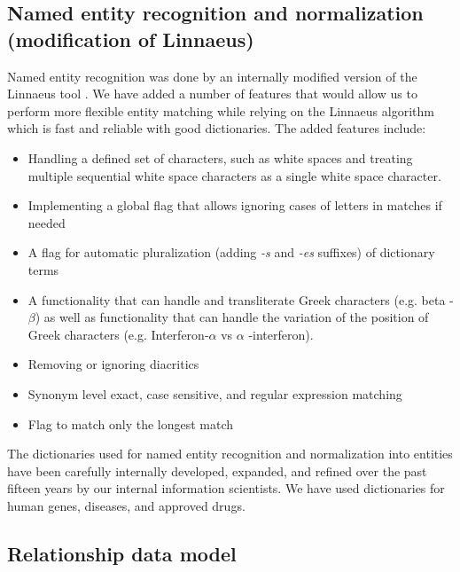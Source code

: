 \documentclass[final,12pt,3p,times,twocolumn,authoryear]{elsarticle}
\begin{document}
\subsection{Named entity recognition and normalization (modification of Linnaeus)}

Named entity recognition was done by an internally modified version of the Linnaeus tool \citep{gerner2010linnaeus}. We have added a number of features that would allow us to perform more flexible entity matching while relying on the Linnaeus algorithm which is fast and reliable with good dictionaries. The added features include: 
\begin{itemize}
    \item Handling a defined set of characters, such as white spaces and treating multiple sequential white space characters as a single white space character. 
    \item Implementing a global flag that allows ignoring cases of letters in matches if needed
    \item A flag for automatic pluralization (adding \textit{-s} and \textit{-es} suffixes) of dictionary terms
    \item A functionality that can handle and transliterate Greek characters (e.g. beta - $\beta$) as well as functionality that can handle the variation of the position of Greek characters (e.g. Interferon-$\alpha$ vs $\alpha$ -interferon).
    \item Removing or ignoring diacritics
    \item Synonym level exact, case sensitive, and regular expression matching
    \item Flag to match only the longest match
\end{itemize}

The dictionaries used for named entity recognition and normalization into entities have been carefully internally developed, expanded, and refined over the past fifteen years by our internal information scientists. We have used dictionaries for human genes, diseases, and approved drugs. 
 

\subsection{Relationship data model}
\end{document}
